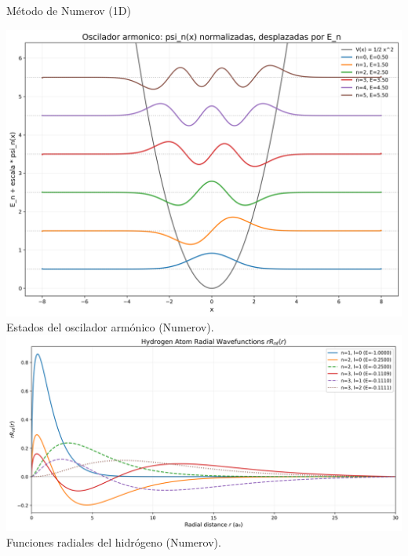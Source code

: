 \documentclass[final]{beamer}
\begin{document}
\begin{frame}[t]
\begin{columns}[t,totalwidth=\textwidth]
\begin{column}{0.32\textwidth}
\begin{block}{Método de Numerov (1D)}
\begin{center}
  \includegraphics[width=\linewidth]{harmonic.png}\\[-0.2em]
  {\small Estados del oscilador armónico (Numerov).}\\[0.6em]
  \includegraphics[width=\linewidth]{hydrogen.png}\\[-0.2em]
  {\small Funciones radiales del hidrógeno (Numerov).}
\end{center}




\end{block}
\end{column}
\end{columns}
\end{frame}
\end{document}
